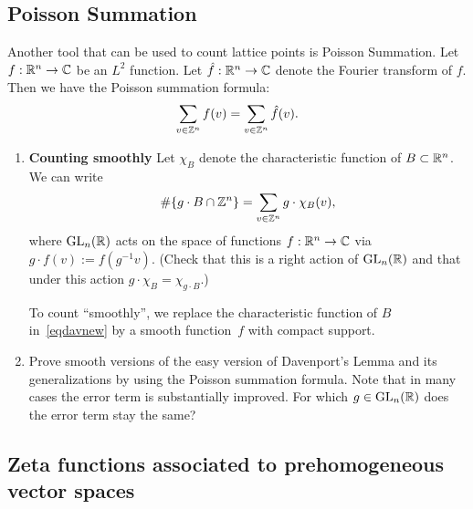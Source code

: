 \documentclass[12pt,amsfont]{amsart}
\begin{document}
\subsection{
\textbf{Poisson Summation}}

Another tool that can be used to count lattice points is Poisson
Summation.  Let $f:{\mathbb R}^n\to{\mathbb C}$ be an $L^2$ function. Let
$\hat{f}:{\mathbb R}^n\to{\mathbb C}$ denote the Fourier transform of $f$. Then we have
the Poisson summation formula:
\begin{equation}\label{ps}
\sum_{v\in{\mathbb Z}^n}f(v)=\sum_{v\in{\mathbb Z}^n}\hat{f}(v).
\end{equation}
\begin{enumerate}
\item
\textbf{Counting smoothly} Let $\chi_B$ denote the characteristic
function of $B\subset{\mathbb R}^n$. We can write 
\begin{equation}\label{eqdavnew}
\#\{g\cdot B \cap {\mathbb Z}^n\}=\sum_{v\in{\mathbb Z}^n} g\cdot\chi_B(v),
\end{equation}
where $\operatorname{GL}_n({\mathbb R})$ acts on the space of functions $f:{\mathbb R}^n\to{\mathbb C}$ via
$g\cdot f(v):=f(g^{-1}v)$. (Check that this is a right action of
$\operatorname{GL}_n({\mathbb R})$ and that under this action $g\cdot\chi_B=\chi_{g\cdot B}$.)

To count ``smoothly'', we replace the characteristic function of $B$
in~\eqref{eqdavnew} by a smooth function~$f$ with compact support.

\item Prove smooth versions of the easy version of Davenport's Lemma and its
generalizations by using the Poisson summation formula. Note that in
many cases the error term is substantially improved. For which
$g\in\operatorname{GL}_n({\mathbb R})$ does the error term stay the same?
\end{enumerate}

\subsection{
{ {\bf Zeta functions associated to prehomogeneous vector spaces}}}
\end{document}
